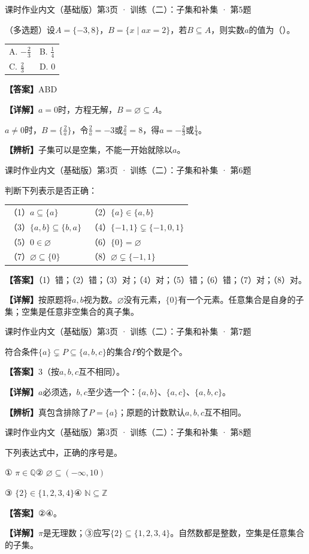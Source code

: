 \documentclass[UTF8,10pt,aspectratio=169]{ctexbeamer}
\makeatletter
\newcommand{\Answer}[1]{\par\vspace{0.2cm}\textbf{【答案】}#1}
\newcommand{\Analysis}[1]{\par\vspace{0.2cm}\textbf{【详解】}#1}
\newcommand{\Choices}[4]{\par\vspace{0.2cm}\begin{tabular}{@{}p{0.47\textwidth}p{0.47\textwidth}@{}}A. #1 & B. #2 \\[0.15cm] C. #3 & D. #4\end{tabular}}
\newcommand{\N}{\mathbb N}
\newcommand{\Z}{\mathbb Z}
\newcommand{\Q}{\mathbb Q}
\newcommand{\blank}{\underline{\hspace{1.6cm}}}
\newcommand{\Tip}[1]{\par\vspace{0.2cm}\textbf{【辨析】}#1}
\newcommand{\Source}[1]{{\scriptsize\color{gray}#1}\par\vspace{0.25cm}}
\makeatother
\begin{document}
\begin{frame}
\Source{课时作业内文（基础版）第3页 · 训练（二）：子集和补集 · 第5题}
（多选题）设$A=\{-3,8\}$，$B=\{x\mid ax=2\}$，若$B\subseteq A$，则实数$a$的值为（\quad）。
\Choices{$-\frac23$}{$\frac14$}{$\frac23$}{$0$}
\pause
\Answer{ABD}
\Analysis{$a=0$时，方程无解，$B=\varnothing\subseteq A$。
\par $a\ne0$时，$B=\{\frac2a\}$，令$\frac2a=-3$或$\frac2a=8$，得$a=-\frac23$或$\frac14$。}
\Tip{子集可以是空集，不能一开始就除以$a$。}
\end{frame}
\begin{frame}
\Source{课时作业内文（基础版）第3页 · 训练（二）：子集和补集 · 第6题}
判断下列表示是否正确：
\begin{tabular}{@{}p{}p{}@{}}
（1）$a\subseteq\{a\}$ & （2）$\{a\}\in\{a,b\}$\\[0.2cm]
（3）$\{a,b\}\subseteq\{b,a\}$ & （4）$\{-1,1\}\subsetneq\{-1,0,1\}$\\[0.2cm]
（5）$0\in\varnothing$ & （6）$\{0\}=\varnothing$\\[0.2cm]
（7）$\varnothing\subseteq\{0\}$ & （8）$\varnothing\subsetneq\{-1,1\}$
\end{tabular}
\pause
\Answer{（1）错；（2）错；（3）对；（4）对；（5）错；（6）错；（7）对；（8）对。}
\Analysis{按原题将$a,b$视为数。$\varnothing$没有元素，$\{0\}$有一个元素。任意集合是自身的子集；空集是任意非空集合的真子集。}
\end{frame}
\begin{frame}
\Source{课时作业内文（基础版）第3页 · 训练（二）：子集和补集 · 第7题}
符合条件$\{a\}\subsetneq P\subseteq\{a,b,c\}$的集合$P$的个数是\blank 个。
\pause
\Answer{$3$（按$a,b,c$互不相同）。}
\Analysis{$a$必须选，$b,c$至少选一个：$\{a,b\}$、$\{a,c\}$、$\{a,b,c\}$。}
\Tip{真包含排除了$P=\{a\}$；原题的计数默认$a,b,c$互不相同。}
\end{frame}
\begin{frame}
\Source{课时作业内文（基础版）第3页 · 训练（二）：子集和补集 · 第8题}
下列表达式中，正确的序号是\blank。
\par ① $\pi\in\Q$\qquad ② $\varnothing\subseteq(-\infty,10)$
\par ③ $\{2\}\in\{1,2,3,4\}$\qquad ④ $\N\subseteq\Z$
\pause
\Answer{②④。}
\Analysis{$\pi$是无理数；③应写$\{2\}\subseteq\{1,2,3,4\}$。自然数都是整数，空集是任意集合的子集。}
\end{frame}
\end{document}
